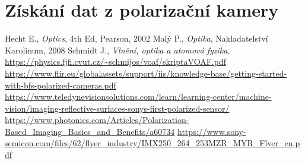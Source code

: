 \documentclass[a4paper]{article}
\numberwithin{equation}{section}
\begin{document}
	\newpage
	\section{Získání dat z polarizační kamery}

    \newpage
    \begin{thebibliography}{99}
         Hecht E., \textit{Optics}, 4th Ed, Pearson, 2002
         Malý P., \textit{Optika}, Nakladatelství Karolinum, 2008
         Schmidt J., \textit{Vlnění, optika a atomová fyzika}, \url{https://physics.fjfi.cvut.cz/~schmijos/voaf/skriptaVOAF.pdf}
         \url{https://www.flir.eu/globalassets/support/iis/knowledge-base/getting-started-with-bfs-polarized-cameras.pdf}
         \url{https://www.teledynevisionsolutions.com/learn/learning-center/machine-vision/imaging-reflective-surfaces-sonys-first-polarized-sensor/}
         \url{https://www.photonics.com/Articles/Polarization-Based_Imaging_Basics_and_Benefits/a60734}
         \url{https://www.sony-semicon.com/files/62/flyer_industry/IMX250_264_253MZR_MYR_Flyer_en.pdf}
    \end{thebibliography}
\end{document}
